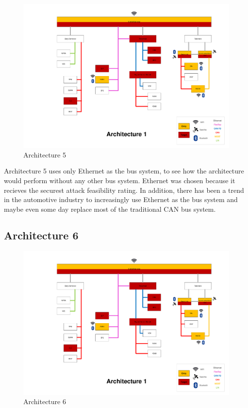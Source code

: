 \begin{figure}[h!]
    \caption{Architecture 5}
    \includegraphics[width=\textwidth, page=5]{../Architectures-survey.pdf}
\end{figure}

Architecture 5 uses only Ethernet as the bus system, to see how the architecture would perform without any other bus system.
Ethernet was chosen because it recieves the securest attack feasibility rating.
In addition, there has been a trend in the automotive industry to increasingly use Ethernet as the bus system and maybe even some day replace most of the traditional CAN bus system.\par


\subsection*{Architecture 6}
\label{sec:arch6}

\begin{figure}[h!]
    \caption{Architecture 6}
    \includegraphics[width=\textwidth, page=6]{../Architectures-survey.pdf}
\end{figure}

